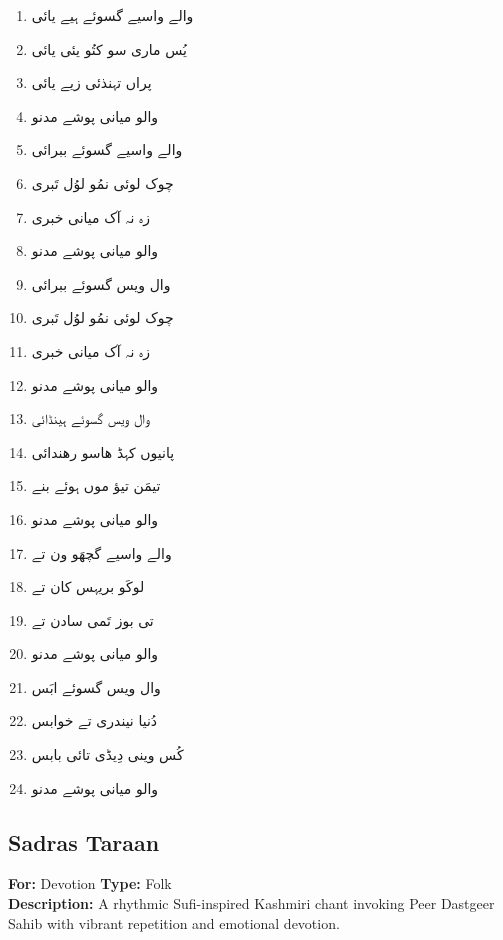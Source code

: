 \documentclass[12pt]{article}
\newcommand{\bigarabic}[1]{\fontsize{16pt}{18pt}\selectfont \textarabic{#1}}
\begin{document}
\begin{multicols}{2}
\begin{RTL}
\begin{enumerate}[leftmargin=*, label=\arabic*., font=\fontsize{16pt}{18pt}\selectfont]
  \item \bigarabic{والے واسیے گسوئے ہیے یائی}
  \item \bigarabic{یُس ماری سو کتُو یئی یائی}
  \item \bigarabic{پراں تہنذئی زیے یائی}
  \item \bigarabic{والو میانی پوشے مدنو}
  \item \bigarabic{والے واسیے گسوئے ببرائی}
  \item \bigarabic{چوک لوئی نمُو لوُل تَبری}
  \item \bigarabic{زہ نہ آک میانی خبری}
  \item \bigarabic{والو میانی پوشے مدنو}
  \item \bigarabic{وال ویس گسوئے ببرائی}
  \item \bigarabic{چوک لوئی نمُو لوُل تَبری}
  \item \bigarabic{زہ نہ آک میانی خبری}
  \item \bigarabic{والو میانی پوشے مدنو}
  \item \bigarabic{وال ویس گسوئے ہینڈائی}
  \item \bigarabic{پانیوں کہڈ ھاسو رھندائی}
  \item \bigarabic{تیمَن تیؤ موں ہوئے بنے}
  \item \bigarabic{والو میانی پوشے مدنو}
  \item \bigarabic{والے واسیے گچھَو ون تے}
  \item \bigarabic{لوکَو بریہس کان تے}
  \item \bigarabic{تی بوز تَمی سادن تے}
  \item \bigarabic{والو میانی پوشے مدنو}
  \item \bigarabic{وال ویس گسوئے ابَس}
  \item \bigarabic{دُنیا نیندری تے خوابس}
  \item \bigarabic{کُس وینی دِیڈی تائی بابس}
  \item \bigarabic{والو میانی پوشے مدنو}
\end{enumerate}
\end{RTL}
\end{multicols}

\subsection*{Sadras Taraan} 
\textbf{For:} Devotion \quad \textbf{Type:} Folk\\
\quad \textbf{Description:} A rhythmic Sufi-inspired Kashmiri chant invoking Peer Dastgeer Sahib with vibrant repetition and emotional devotion.
\end{document}
